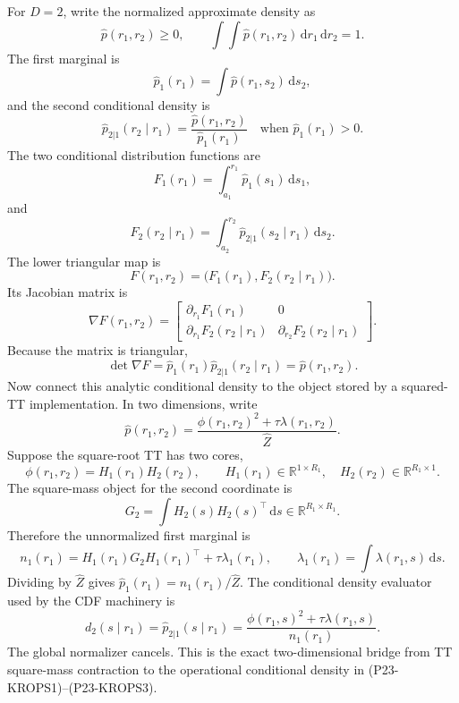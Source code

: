 \documentclass[11pt]{article}
\newcommand{\R}{\mathbb R}
\newcommand{\dd}{\,\mathrm d}
\begin{document}
For \(D=2\), write the normalized approximate density as
\[
    \widehat p(r_1,r_2)\ge0,
    \qquad
    \int\!\!\int \widehat p(r_1,r_2)\dd r_1\dd r_2=1.
    \tag{P23-KR2-1}
\]
The first marginal is
\[
    \widehat p_1(r_1)
    =
    \int \widehat p(r_1,s_2)\dd s_2,
    \tag{P23-KR2-2}
\]
and the second conditional density is
\[
    \widehat p_{2|1}(r_2\mid r_1)
    =
    \frac{\widehat p(r_1,r_2)}{\widehat p_1(r_1)}
    \quad\text{when }\widehat p_1(r_1)>0.
    \tag{P23-KR2-3}
\]
The two conditional distribution functions are
\[
    F_1(r_1)
    =
    \int_{a_1}^{r_1}\widehat p_1(s_1)\dd s_1,
    \tag{P23-KR2-4}
\]
and
\[
    F_2(r_2\mid r_1)
    =
    \int_{a_2}^{r_2}
    \widehat p_{2|1}(s_2\mid r_1)\dd s_2.
    \tag{P23-KR2-5}
\]
The lower triangular map is
\[
    F(r_1,r_2)=
    \bigl(F_1(r_1),F_2(r_2\mid r_1)\bigr).
    \tag{P23-KR2-6}
\]
Its Jacobian matrix is
\[
    \nabla F(r_1,r_2)
    =
    \begin{bmatrix}
    \partial_{r_1}F_1(r_1) & 0\\
    \partial_{r_1}F_2(r_2\mid r_1) &
    \partial_{r_2}F_2(r_2\mid r_1)
    \end{bmatrix}.
    \tag{P23-KR2-7}
\]
Because the matrix is triangular,
\[
    \det\nabla F
    =
    \widehat p_1(r_1)\widehat p_{2|1}(r_2\mid r_1)
    =
    \widehat p(r_1,r_2).
    \tag{P23-KR2-8}
\]
Now connect this analytic conditional density to the object stored by a
squared-TT implementation.  In two dimensions, write
\[
    \widehat p(r_1,r_2)
    =
    \frac{\phi(r_1,r_2)^2+\tau\lambda(r_1,r_2)}
    {\widehat Z}.
    \tag{P23-KR2-8a}
\]
Suppose the square-root TT has two cores,
\[
    \phi(r_1,r_2)
    =
    H_1(r_1)H_2(r_2),
    \qquad
    H_1(r_1)\in\R^{1\times R_1},\quad
    H_2(r_2)\in\R^{R_1\times1}.
    \tag{P23-KR2-8b}
\]
The square-mass object for the second coordinate is
\[
    G_2
    =
    \int H_2(s)H_2(s)^\top\dd s
    \in\R^{R_1\times R_1}.
    \tag{P23-KR2-8c}
\]
Therefore the unnormalized first marginal is
\[
    n_1(r_1)
    =
    H_1(r_1)G_2H_1(r_1)^\top
    +
    \tau\lambda_1(r_1),
    \qquad
    \lambda_1(r_1)=\int\lambda(r_1,s)\dd s.
    \tag{P23-KR2-8d}
\]
Dividing by \(\widehat Z\) gives \(\widehat p_1(r_1)=n_1(r_1)/\widehat Z\).
The conditional density evaluator used by the CDF machinery is
\[
    d_2(s\mid r_1)
    =
    \widehat p_{2|1}(s\mid r_1)
    =
    \frac{\phi(r_1,s)^2+\tau\lambda(r_1,s)}
    {n_1(r_1)}.
    \tag{P23-KR2-8e}
\]
The global normalizer cancels.  This is the exact two-dimensional bridge from
TT square-mass contraction to the operational conditional density in
(P23-KROPS1)--(P23-KROPS3).
\end{document}
